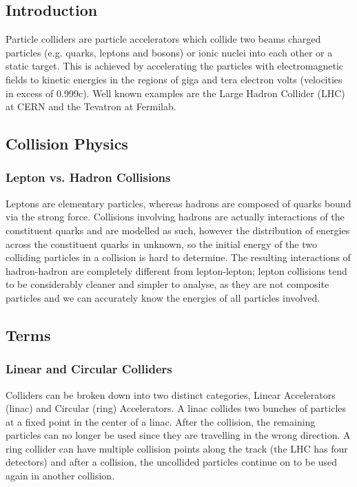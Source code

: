  \subsection{Introduction}
 
 Particle colliders are particle accelerators which collide two beams charged particles (e.g. quarks, leptons and bosons) or ionic nuclei into each other or a static target. This is achieved by accelerating the particles with electromagnetic fields to kinetic energies in the regions of giga and tera electron volts (velocities in excess of 0.999c). Well known examples are the Large Hadron Collider (LHC) at CERN and the Tevatron at Fermilab.
 
 \subsection{Collision Physics}
 
 \subsubsection{Lepton vs. Hadron Collisions}
 
 Leptons are elementary particles, whereas hadrons are composed of quarks bound via the strong force. Collisions involving hadrons are actually interactions of the constituent quarks and are modelled as such, however the distribution of energies across the constituent quarks in unknown, so the initial energy of the two colliding particles in a collision is hard to determine. The resulting interactions of hadron-hadron are completely different from lepton-lepton; lepton collisions tend to be considerably cleaner and simpler to analyse, as they are not composite particles and we can accurately know the energies of all particles involved. \cite{CERN:ColliderPhysics}
 
 \subsection{Terms}
 
 \subsubsection{Linear and Circular Colliders}
 
 Colliders can be broken down into two distinct categories, Linear Accelerators (linac) and Circular (ring) Accelerators.
 A linac collides two bunches of particles at a fixed point in the center of a linac. After the collision, the remaining particles can no longer be used since they are travelling in the wrong direction. A ring collider can have multiple collision points along the track (the LHC has four detectors) and after a collision, the uncollided particles continue on to be used again in another collision.  
 
